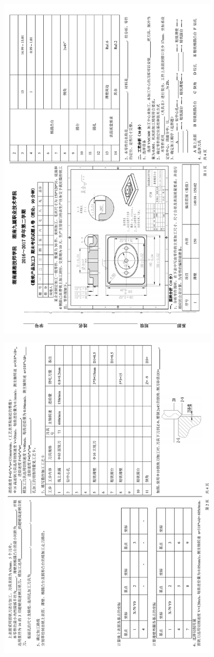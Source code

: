 \documentclass[a4paper,12pt]{article}
\numberwithin{table}{section}
\numberwithin{figure}{section}
\begin{document}
\newpage 
\begin{figure}[!h]
	\centering	
	\includegraphics[height=\textwidth,angle=90]{images/shijuan1}
\end{figure}
\begin{figure}[!h]
	\centering	
	\includegraphics[height=\textwidth,angle=90]{images/shijuan2}
\end{figure}
\end{document}
